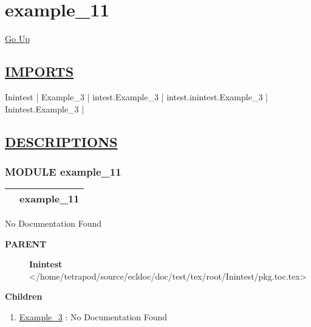 \chapter*{\color{headfile}
example_11
}
\hypertarget{ecldoc:toc:example_11}{}
\hyperlink{ecldoc:toc:root}{Go Up}

\section*{\underline{\textsf{IMPORTS}}}
\begin{doublespace}
{\large
Inintest |
Example\_3 |
intest.Example\_3 |
intest.inintest.Example\_3 |
Inintest.Example\_3 |
}
\end{doublespace}

\section*{\underline{\textsf{DESCRIPTIONS}}}
\subsection*{\textsf{\colorbox{headtoc}{\color{white} MODULE}
example\_11}}

\hypertarget{ecldoc:example_11}{}

{\renewcommand{\arraystretch}{1.5}
\begin{tabularx}{\textwidth}{|>{\raggedright\arraybackslash}l|X|}
\hline
\hspace{0pt}\mytexttt{\color{red} } & \textbf{example\_11} \\
\hline
\end{tabularx}
}

\par





No Documentation Found










\par
\begin{description}
\item [\colorbox{tagtype}{\color{white} \textbf{\textsf{PARENT}}}] \textbf{Inintest} </home/tetrapod/source/ecldoc/doc/test/tex/root/Inintest/pkg.toc.tex>
\end{description}


\textbf{Children}
\begin{enumerate}
\item \hyperlink{ecldoc:Inintest.Example_3}{Example\_3}
: No Documentation Found
\end{enumerate}

